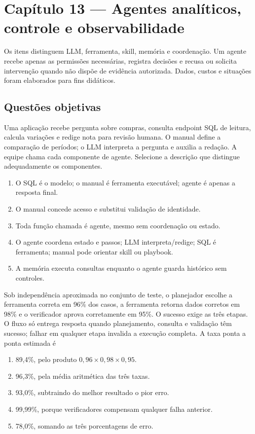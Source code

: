 \section{Capítulo 13 --- Agentes analíticos, controle e observabilidade}

Os itens distinguem LLM, ferramenta, skill, memória e coordenação. Um agente recebe apenas as permissões necessárias, registra decisões e recusa ou solicita intervenção quando não dispõe de evidência autorizada. Dados, custos e situações foram elaborados para fins didáticos.

\subsection{Questões objetivas}

\TextoBase
Uma aplicação recebe pergunta sobre compras, consulta endpoint SQL de leitura, calcula variações e redige nota para revisão humana. O manual define a comparação de períodos; o LLM interpreta a pergunta e auxilia a redação. A equipe chama cada componente de agente.
\FonteDidatica
\Comando Selecione a descrição que distingue adequadamente os componentes.
\begin{enumerate}[label=\Alph*)]
\item O SQL é o modelo; o manual é ferramenta executável; agente é apenas a resposta final.
\item O manual concede acesso e substitui validação de identidade.
\item Toda função chamada é agente, mesmo sem coordenação ou estado.
\item O agente coordena estado e passos; LLM interpreta/redige; SQL é ferramenta; manual pode orientar skill ou playbook.
\item A memória executa consultas enquanto o agente guarda histórico sem controles.
\end{enumerate}

\TextoBase
Sob independência aproximada no conjunto de teste, o planejador escolhe a ferramenta correta em 96\% dos casos, a ferramenta retorna dados corretos em 98\% e o verificador aprova corretamente em 95\%. O sucesso exige as três etapas.
O fluxo só entrega resposta quando planejamento, consulta e validação têm sucesso; falhar em qualquer etapa invalida a execução completa.
\FonteDidatica
\Comando A taxa ponta a ponta estimada é
\begin{enumerate}[label=\Alph*)]
\item 89,4\%, pelo produto $0{,}96\times0{,}98\times0{,}95$.
\item 96,3\%, pela média aritmética das três taxas.
\item 93,0\%, subtraindo do melhor resultado o pior erro.
\item 99,99\%, porque verificadores compensam qualquer falha anterior.
\item 78,0\%, somando as três porcentagens de erro.
\end{enumerate}

